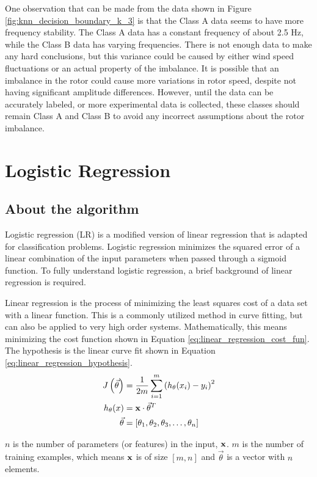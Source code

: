 One observation that can be made from the data shown in Figure \ref{fig:knn_decision_boundary_k_3} is that the Class A data seems to have more frequency stability.  The Class A data has a constant frequency of about 2.5 Hz, while the Class B data has varying frequencies.  There is not enough data to make any hard conclusions, but this variance could be caused by either wind speed fluctuations or an actual property of the imbalance.  It is possible that an imbalance in the rotor could cause more variations in rotor speed, despite not having significant amplitude differences.  However, until the data can be accurately labeled, or more experimental data is collected, these classes should remain Class A and Class B to avoid any incorrect assumptions about the rotor imbalance.

\section{Logistic Regression}
\subsection{About the algorithm}
Logistic regression (LR) is a modified version of linear regression that is adapted for classification problems.  Logistic regression minimizes the squared error of a linear combination of the input parameters when passed through a sigmoid function.  To fully understand logistic regression, a brief background of linear regression is required. 

Linear regression is the process of minimizing the least squares cost of a data set with a linear function.  This is a commonly utilized method in curve fitting, but can also be applied to very high order systems.  Mathematically, this means minimizing the cost function shown in Equation \ref{eq:linear_regression_cost_fun}.  The hypothesis is the linear curve fit shown in Equation \ref{eq:linear_regression_hypothesis}.
\begin{align}
	J\left(\vec{\theta}\right) &= \frac{1}{2m} \sum_{i=1}^{m}{\left(h_{\theta}(x_i) - y_i\right)^2} \label{eq:linear_regression_cost_fun} \\
	h_{\theta}(x) &= \mathbf{x} \cdot \vec{\theta}^T\label{eq:linear_regression_hypothesis} \\
	\vec{\theta} &= [\theta_1, \theta_2, \theta_3, \hdots, \theta_n]
\end{align}

$n$ is the number of parameters (or features) in the input, $\mathbf{x}$.  $m$ is the number of training examples, which means $\mathbf{x}$ is of size $[m, n]$ and $\vec{\theta}$ is a vector with $n$ elements.


